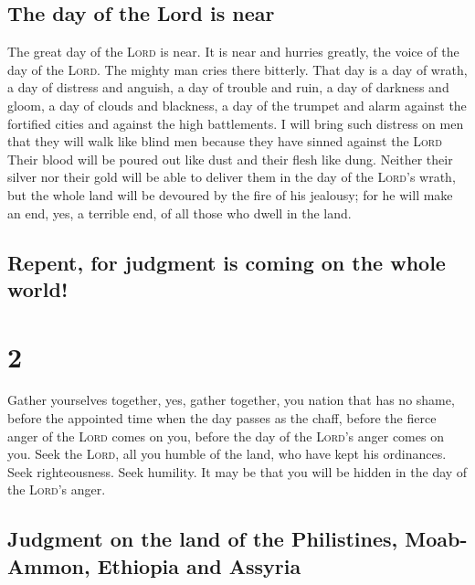 \hypertarget{the-day-of-the-lord-is-near}{%
\subsection{The day of the Lord is
near}\label{the-day-of-the-lord-is-near}}

 The great day of the \textsc{Lord} is near. It is near
and hurries greatly, the voice of the day of the \textsc{Lord}. The
mighty man cries there bitterly.  That day is a day of
wrath, a day of distress and anguish, a day of trouble and ruin, a day
of darkness and gloom, a day of clouds and blackness,  a
day of the trumpet and alarm against the fortified cities and against
the high battlements.  I will bring such distress on men
that they will walk like blind men because they have sinned against the
\textsc{Lord} Their blood will be poured out like dust and their flesh
like dung.  Neither their silver nor their gold will be
able to deliver them in the day of the \textsc{Lord}'s wrath, but the
whole land will be devoured by the fire of his jealousy; for he will
make an end, yes, a terrible end, of all those who dwell in the land.

\hypertarget{repent-for-judgment-is-coming-on-the-whole-world}{%
\subsection{Repent, for judgment is coming on the whole
world!}\label{repent-for-judgment-is-coming-on-the-whole-world}}

\hypertarget{section-1}{%
\section{2}\label{section-1}}

 Gather yourselves together, yes, gather together, you
nation that has no shame,  before the appointed time when
the day passes as the chaff, before the fierce anger of the
\textsc{Lord} comes on you, before the day of the \textsc{Lord}'s anger
comes on you.  Seek the \textsc{Lord}, all you humble of
the land, who have kept his ordinances. Seek righteousness. Seek
humility. It may be that you will be hidden in the day of the
\textsc{Lord}'s anger.

\hypertarget{judgment-on-the-land-of-the-philistines-moab-ammon-ethiopia-and-assyria}{%
\subsection{Judgment on the land of the Philistines, Moab-Ammon,
Ethiopia and
Assyria}\label{judgment-on-the-land-of-the-philistines-moab-ammon-ethiopia-and-assyria}}

